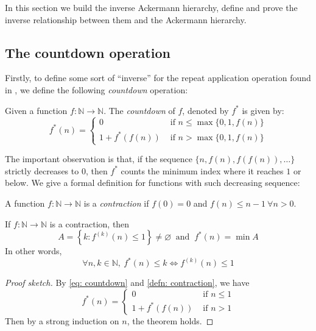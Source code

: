 In this section we build the inverse Ackermann hierarchy, define and prove the inverse relationship between them and the Ackermann hierarchy.

\subsection{The countdown operation}

Firstly, to define some sort of ``inverse'' for the repeat application operation found in , we define the following \textit{countdown} operation:

\begin{defn} \label{defn: countdown}
Given a function $f: \mathbb{N} \to \mathbb{N}$. The \textit{countdown} of $f$, denoted by $f^*$ is given by:
\begin{equation} \label{eq: countdown}
f^*(n) = \begin{cases}
0 & \text{ if } n \le \max\{0, 1, f(n)\} \\ 1 + f^*(f(n)) & \text{ if } n > \max\{0, 1, f(n)\}
\end{cases}
\end{equation}
\end{defn}
The important observation is that, if the sequence $\{n, f(n), f(f(n)), \ldots\}$ strictly decreases to $0$, then $f^*$ counts the minimum index where it reaches $1$ or below. We give a formal definition for functions with such decreasing sequence:

\begin{defn} \label{defn: contraction}
A function $f: \mathbb{N} \to \mathbb{N}$ is a \textit{contraction} if $f(0) = 0$ and $f(n) \le n-1 \ \forall n > 0$.
\end{defn}

\begin{thm} \label{thm: countdown contraction}
If $f: \mathbb{N} \to \mathbb{N}$ is a contraction, then
\begin{equation*}
A = \left\{k: f^{(k)}(n) \le 1\right\} \neq \varnothing \ \text{ and } \ f^*(n) = \min A
\end{equation*}
In other words,
\begin{equation*}
\forall n, k\in \mathbb{N}, \ f^*(n) \le k \iff f^{(k)}(n) \le 1
\end{equation*}
\end{thm}

\begin{proof}[Proof sketch]
By \eqref{eq: countdown} and \cref{defn: contraction}, we have
\begin{equation*}
f^*(n) = \begin{cases}
0 & \text{ if } n \le 1 \\ 1 + f^*(f(n)) & \text{ if } n > 1
\end{cases}
\end{equation*}
Then by a strong induction on $n$, the theorem holds.
\end{proof}

